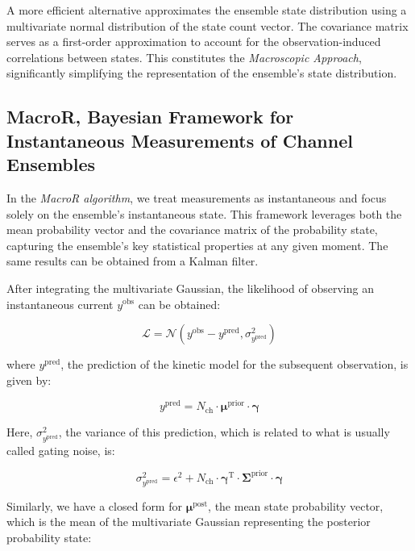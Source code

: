 \documentclass[pdflatex,sn-mathphys-num]{sn-jnl}%
\theoremstyle{thmstyleone}%
\theoremstyle{thmstyletwo}%
\theoremstyle{thmstylethree}%
\begin{document}
A more efficient alternative approximates the ensemble state distribution using a multivariate normal distribution of the state count vector. The covariance matrix serves as a first-order approximation to account for the observation-induced correlations between states. This constitutes the \textit{Macroscopic Approach}, significantly simplifying the representation of the ensemble's state distribution.

\subsection{MacroR, Bayesian Framework for Instantaneous Measurements of Channel Ensembles}

In the \textit{MacroR algorithm}, we treat measurements as instantaneous and focus solely on the ensemble's instantaneous state. This framework leverages both the mean probability vector and the covariance matrix of the probability state, capturing the ensemble's key statistical properties at any given moment. The same results can be obtained from a Kalman filter. 

After integrating the multivariate Gaussian, the likelihood of observing an instantaneous current \( y^{\text{obs}} \) can be obtained:

\begin{equation}
	\mathcal{L} = \mathcal{N} \left( y^{\text{obs}} - y^{\text{pred}}, \sigma^2_{y^{\text{pred}}} \right)
	\label{eq:macro_likelihood}
\end{equation}

where \( y^{\text{pred}} \), the prediction of the kinetic model for the subsequent observation, is given by:

\begin{equation}
	y^{\text{pred}} = N_{\text{ch}} \cdot \boldsymbol{\mu}^{\text{prior}} \cdot \boldsymbol{\gamma}
	\label{eq:macro_predicted_y}
\end{equation}

Here, \( \sigma^2_{y^{\text{pred}}} \), the variance of this prediction, which is related to what is usually called gating noise, is:

\begin{equation}
	\sigma^2_{y^{\text{pred}}} = \epsilon^2 + N_{\text{ch}} \cdot \boldsymbol{\gamma}^{\mathrm{T}} \cdot \boldsymbol{\Sigma}^{\text{prior}} \cdot \boldsymbol{\gamma}
	\label{eq:macro_sigma_pred}
\end{equation}

Similarly, we have a closed form for \( \boldsymbol{\mu}^{\text{post}} \), the mean state probability vector, which is the mean of the multivariate Gaussian representing the posterior probability state:
\end{document}
